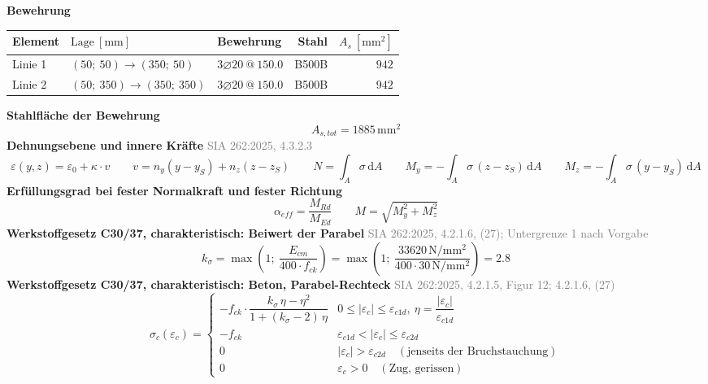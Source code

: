 \documentclass[11pt,a4paper]{article}
\newcommand{\normref}[1]{{\small\textcolor{gray}{#1}}}
\begin{document}
\noindent\textbf{Bewehrung}
\begin{longtable}{lllrr}
\hline
Element & $\text{Lage}\ [\mathrm{mm}]$ & Bewehrung & Stahl & $A_s\ [\mathrm{mm}^2]$ \\
\hline
\endhead
Linie 1 & $(50;\ 50) \rightarrow (350;\ 50)$ & $3 \varnothing 20\ @\ 150.0$ & B500B & $942$ \\
Linie 2 & $(50;\ 350) \rightarrow (350;\ 350)$ & $3 \varnothing 20\ @\ 150.0$ & B500B & $942$ \\
\hline
\end{longtable}
\noindent\textbf{Stahlfläche der Bewehrung}
\begin{equation*}
A_{s,tot} = 1885\,\mathrm{mm}^{2}
\end{equation*}
\noindent\textbf{Dehnungsebene und innere Kräfte} \hfill \normref{SIA 262:2025, 4.3.2.3}
\begin{equation*}
\varepsilon(y, z) = \varepsilon_0 + \kappa \cdot v \qquad v = n_y (y - y_S) + n_z (z - z_S) \qquad N = \int_A \sigma\,\mathrm{d}A \qquad M_y = -\int_A \sigma\,(z - z_S)\,\mathrm{d}A \qquad M_z = -\int_A \sigma\,(y - y_S)\,\mathrm{d}A
\end{equation*}
\noindent\textbf{Erfüllungsgrad bei fester Normalkraft und fester Richtung}
\begin{equation*}
\alpha_{eff} = \frac{M_{Rd}}{M_{Ed}} \qquad M = \sqrt{M_y^2 + M_z^2}
\end{equation*}
\noindent\textbf{Werkstoffgesetz C30/37, charakteristisch: Beiwert der Parabel} \hfill \normref{SIA 262:2025, 4.2.1.6, (27); Untergrenze 1 nach Vorgabe}
\begin{equation*}
k_{\sigma} = \max\left(1;\ \frac{E_{cm}}{400 \cdot f_{ck}}\right) = \max\left(1;\ \frac{33620\,\mathrm{N}/\mathrm{mm}^{2}}{400 \cdot 30\,\mathrm{N}/\mathrm{mm}^{2}}\right) = 2.8
\end{equation*}
\noindent\textbf{Werkstoffgesetz C30/37, charakteristisch: Beton, Parabel-Rechteck} \hfill \normref{SIA 262:2025, 4.2.1.5, Figur 12; 4.2.1.6, (27)}
\begin{equation*}
\sigma_c(\varepsilon_c) = \begin{cases} -f_{ck} \cdot \dfrac{k_\sigma\,\eta - \eta^2}{1 + (k_\sigma - 2)\,\eta} & 0 \le |\varepsilon_c| \le \varepsilon_{c1d},\ \eta = \dfrac{|\varepsilon_c|}{\varepsilon_{c1d}} \\[2ex] -f_{ck} & \varepsilon_{c1d} < |\varepsilon_c| \le \varepsilon_{c2d} \\[1ex] 0 & |\varepsilon_c| > \varepsilon_{c2d} \quad (\text{jenseits der Bruchstauchung}) \\[1ex] 0 & \varepsilon_c > 0 \quad (\text{Zug, gerissen}) \end{cases}
\end{equation*}
\end{document}
